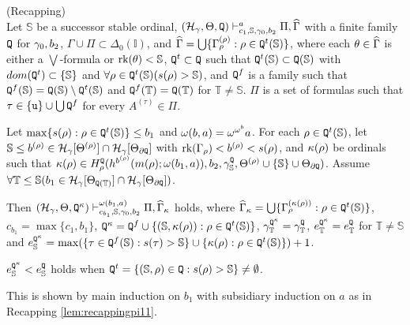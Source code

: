 \documentclass{article}
\newcommand{\mS}{\mathbb{S}}
\newcommand{\mT}{\mathbb{T}}
\begin{document}
\blem\label{lem:recapping}{\rm (Recapping)}\\
Let $\mS$ be a successor stable ordinal,
$
(\mathcal{H}_{\gamma},\Theta,{\tt Q})
\vdash^{a}_{c_{1},\mS,\gam_{0},b_{2}}
\Pi,\widehat{\Gamma}
$ with a finite family ${\tt Q}$ for $\gamma_{0}, b_{2}$, $\Gamma\cup\Pi\subset\Delta_{0}(\mathbb{I})$,
and $\widehat{\Gam}=\bigcup\{\Gam_{\rho}^{(\rho)} :\rho\in{\tt Q}^{t}(\mS)\}$, where
each $\theta\in \widehat{\Gamma}$ is either a $\bigvee$-formula or $\rk(\tht)<\mS$,
${\tt Q}^{t}\subset{\tt Q}$ 
such that ${\tt Q}^{t}(\mS)\subset{\tt Q}(\mS)$ with $dom({\tt Q}^{t})\subset\{\mS\}$
and $\fal\rho\in{\tt Q}^{t}(\mS)(s(\rho)>\mS)$, and
${\tt Q}^{f}$ is a family such that ${\tt Q}^{f}(\mS)={\tt Q}(\mS)\setm{\tt Q}^{t}(\mS)$ and
${\tt Q}^{f}(\mT)={\tt Q}(\mT)$ for $\mT\neq\mS$.
$\Pi$ is a set of formulas such that $\tau\in\{{\tt u}\}\cup\bigcup{\tt Q}^{f}$ for every $A^{(\tau)}\in\Pi$.

Let $\max\{s(\rho):\rho\in{\tt Q}^{t}(\mS)\}\leq b_{1}$ and $\omega(b,a)=\omega^{\omega^{b}}a$.
For each $\rho\in{\tt Q}^{t}(\mS)$, let $\mS\leq b^{(\rho)}\in\calh_{\gam}[\Tht^{(\rho)}]
\cap\calh_{\gam}[\Tht_{\partial{\tt Q}}]$ 
with $\mbox{{\rm rk}}(\Gamma_{\rho})<b^{(\rho)}<s(\rho)$,
and 
$\kappa(\rho)$ be ordinals such that
$\kappa(\rho)\in H^{{\tt Q}}_{\rho}(h^{b^{(\rho)}}(m(\rho);\ome(b_{1},a)),b_{2},\gamma_{\mS}^{{\tt Q}},\Theta^{(\rho)}\cup\{\mS\}\cup \Tht_{\partial{\tt Q}})$.
Assume 
$\fal\mT\leq\mS(b_{1}\in\calh_{\gam}[\Tht_{{\tt Q}(\mT)}]\cap\calh_{\gam}[\Tht_{\partial{\tt Q}}])$.


Then 
$
(\mathcal{H}_{\gamma},\Theta,{\tt Q}^{\kappa}
)
\vdash^{\ome(b_{1},a)}_{c_{b_{1}},\mS,\gam_{0} ,b_{2} }
\Pi,\widehat{\Gamma}_{\kappa}
$
holds,
where
$\widehat{\Gamma}_{\kappa}=\bigcup\{\Gam_{\rho}^{(\kap(\rho))}:\rho\in{\tt Q}^{t}(\mS)\}$,
$c_{b_{1}}=\max\{c_{1},b_{1}\}$, 
${\tt Q}^{\kappa}={\tt Q}^{f}\cup\{(\mS,\kap(\rho)): \rho\in{\tt Q}^{t}(\mS)\}$, 
$\gam_{\mT}^{{\tt Q}^{\kap}}=\gam_{\mT}^{{\tt Q}}$,
$e^{{\tt Q}^{\kap}}_{\mT}=e^{{\tt Q}}_{\mT}$ for $\mT\neq\mS$ and
$e^{{\tt Q}^{\kap}}_{\mS}=\max(\{\tau\in{\tt Q}^{f}(\mS): s(\tau)>\mS\}\cup\{\kap(\rho): \rho\in{\tt Q}^{t}(\mS)\})+1$.

$e^{{\tt Q}^{\kap}}_{\mS}<e^{{\tt Q}}_{\mS}$ holds
when
${\tt Q}^{t}=\{(\mS,\rho)\in{\tt Q}: s(\rho)>\mS\}\neq\emptyset$.


\elem
\bprf
This is shown by main induction on $b_{1}$
with subsidiary induction on $a$ as in Recapping \ref{lem:recappingpi11}.
\eprf
\end{document}
